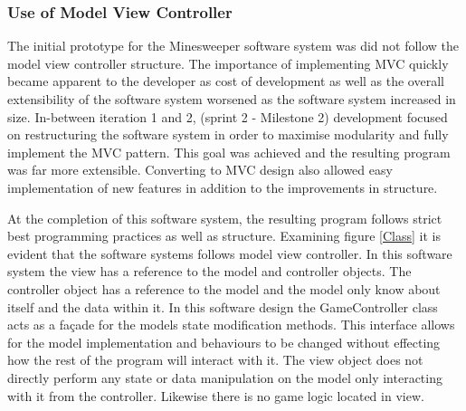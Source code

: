 \documentclass[12pt, a4]{report}
\begin{document}
\subsubsection{Use of Model View Controller}
\par The initial prototype for the Minesweeper software system was did not follow the model view controller structure. The importance of implementing MVC quickly became apparent to the developer as cost of development as well as the overall extensibility of the software system worsened as the software system increased in size. In-between iteration 1 and 2, (sprint 2 - Milestone 2) development focused on restructuring the software system in order to maximise modularity and fully implement the MVC pattern. This goal was achieved and the resulting program was far more extensible. Converting to MVC design also allowed easy implementation of new features in addition to the improvements in structure.
\newline\par
At the completion of this software system, the resulting program follows strict best programming practices as well as structure. Examining figure \ref{Class} it is evident that the software systems follows model view controller. In this software system the view has a reference to the model and controller objects. The controller object has a reference to the model and the model only know about itself and the data within it. In this software design the GameController class acts as a façade for the models state modification methods. This interface allows for the model implementation and behaviours to be changed without effecting how the rest of the program will interact with it. The view object does not directly perform any state or data manipulation on the model only interacting with it from the controller. Likewise there is no game logic located in view.
\end{document}
